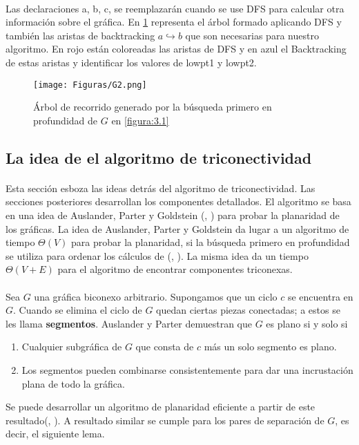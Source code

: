 \paragraph{}
Las declaraciones a, b, c, se reemplazarán cuando se use DFS para calcular otra información sobre el gráfica. En \ref{figura:3.3} representa el árbol formado aplicando DFS y también las aristas de backtracking $a \hookrightarrow b$ que son necesarias para nuestro algoritmo. En rojo están coloreadas las aristas de DFS y en azul el Backtracking de estas aristas y identificar los valores de lowpt1 y lowpt2.

\begin{figure}[H]
\centering
\texttt{[image: Figuras/G2.png]}
\caption{Árbol de recorrido generado por la búsqueda primero en profundidad de $G$ en \ref{figura:3.1}}
\label{figura:3.3}
\end{figure}

\subsection{La idea de el algoritmo de triconectividad}

\paragraph{}
Esta sección esboza las ideas detrás del algoritmo de triconectividad. Las secciones posteriores desarrollan los componentes detallados. El algoritmo se basa en una idea de Auslander, Parter y Goldstein (\citep{auslander-1961}, \citep{goldstein1963efficient}) para probar la planaridad de los gráficas. La idea de Auslander, Parter y Goldstein da lugar a un algoritmo de tiempo $\Theta\left(V\right)$ para probar la planaridad, si la búsqueda primero en profundidad se utiliza para ordenar los cálculos de (\citep{efalgm}, \citep{ept}). La misma idea da un tiempo $\Theta\left(V + E\right)$ para el algoritmo de encontrar componentes triconexas.

\paragraph{}
Sea $G$ una gráfica biconexo arbitrario. Supongamos que un ciclo $c$ se encuentra en $G$. Cuando se elimina el ciclo de $G$ quedan ciertas piezas conectadas; a estos se les llama \textbf{segmentos}. Auslander y Parter \citep{auslander-1961} demuestran que $G$ es plano si y solo si
\begin{enumerate}
\item Cualquier subgráfica de $G$ que consta de $c$ más un solo segmento es plano.
\item Los segmentos pueden combinarse consistentemente para dar una incrustación plana de todo la gráfica.
\end{enumerate}
Se puede desarrollar un algoritmo de planaridad eficiente a partir de este resultado(\citep{efalgm}, \citep{ept}). A resultado similar se cumple para los pares de separación de $G$, es decir, el siguiente lema.

